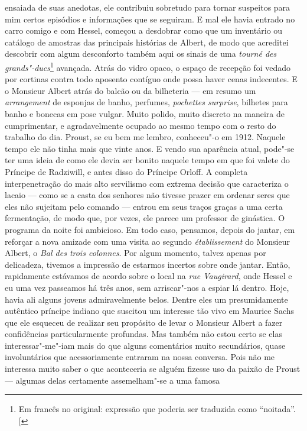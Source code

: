 ensaiada de suas anedotas, ele contribuiu sobretudo para tornar
suspeitos para mim certos episódios e informações que se seguiram. E mal
ele havia entrado no carro comigo e com Hessel, começou a desdobrar como
que um inventário ou catálogo de amostras das principais histórias de
Albert, de modo que acreditei descobrir com algum desconforto também
aqui os sinais de uma \emph{tourné des grands"-ducs}\footnote{Em francês no original: expressão que poderia ser traduzida como ``noitada''. {[}\versal{N. T.}{]}} avançada. Atrás do
vidro opaco, o espaço de recepção foi vedado por cortinas contra todo
aposento contíguo onde possa haver cenas indecentes. E o Monsieur Albert
atrás do balcão ou da bilheteria --- em resumo um \emph{arrangement} de
esponjas de banho, perfumes, \emph{pochettes surprise}, bilhetes para
banho e bonecas em pose vulgar. Muito polido, muito discreto na maneira
de cumprimentar, e agradavelmente ocupado ao mesmo tempo com o resto do
trabalho do dia. Proust, se eu bem me lembro, conheceu"-o em 1912.
Naquele tempo ele não tinha mais que vinte anos. E vendo sua aparência
atual, pode"-se ter uma ideia de como ele devia ser bonito naquele tempo
em que foi valete do Príncipe de Radziwill, e antes disso do Príncipe
Orloff. A completa interpenetração do mais alto servilismo com extrema
decisão que caracteriza o lacaio --- como se a casta dos senhores não
tivesse prazer em ordenar seres que eles não sujeitam pelo comando ---
entrou em seus traços graças a uma certa fermentação, de modo que, por
vezes, ele parece um professor de ginástica. O programa da noite foi
ambicioso. Em todo caso, pensamos, depois do jantar, em reforçar a nova
amizade com uma visita ao segundo \emph{établissement} do Monsieur
Albert, o \emph{Bal des trois colonnes}. Por algum momento, talvez
apenas por delicadeza, tivemos a impressão de estarmos incertos sobre
onde jantar. Então, rapidamente estávamos de acordo sobre o local na
\emph{rue Vaugirard}, onde Hessel e eu uma vez passeamos há três anos,
sem arriscar"-nos a espiar lá dentro. Hoje, havia ali alguns jovens
admiravelmente belos. Dentre eles um presumidamente autêntico príncipe
indiano que suscitou um interesse tão vivo em Maurice Sachs que ele
esqueceu de realizar seu propósito de levar o Monsieur Albert a fazer
confidências particularmente profundas. Mas também não estou certo se
elas interessar"-me"-iam mais do que alguns comentários muito secundários,
quase involuntários que acessoriamente entraram na nossa conversa. Pois
não me interessa muito saber o que aconteceria se alguém fizesse uso da
paixão de Proust --- algumas delas certamente assemelham"-se a uma famosa

